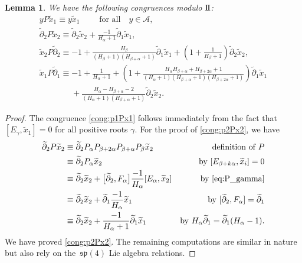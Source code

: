 \documentclass[10pt,a4paper]{amsart}
\numberwithin{equation}{section}
\newtheorem{Lemma}[Theorem]{Lemma}
\newcommand{\II}{\mathrm{I\hspace{-.1em}I}}
\begin{document}
\begin{Lemma} \label{lem:aPb-congruences}
	We have the following congruences modulo $\II$:
	\begin{gather}%
		y P\widetilde{x}_{1} \equiv y\widetilde{x}_{1}\qquad \text{ for all}\quad y \in \mathscr{A}\label{cong:p1Px1},\\
		\widetilde{\partial}_2P\widetilde{x}_2 \equiv \widetilde{\partial}_2\widetilde{x}_2+\frac{-1}{H_\alpha+1}\widetilde{\partial}_1\widetilde{x}_1\label{cong:p2Px2},\\
		\widetilde{x}_2P\widetilde{\partial}_2 \equiv -1 + \frac{H_\beta}{(H_\beta+1)(H_{\beta+\alpha}+1)}\widetilde{\partial}_1\widetilde{x}_1+\left(1+\frac{1}{H_\beta+1}\right)\widetilde{\partial}_2\widetilde{x}_2,\nonumber\\
		\widetilde{x}_1P\widetilde{\partial}_1 \equiv -1+\frac{1}{H_\alpha+1}+\left(1+\frac{H_\alpha H_{\beta+\alpha}+H_{\beta+2\alpha}+1}{(H_\alpha+1)(H_{\beta+\alpha}+1)(H_{\beta+2\alpha}+1)}\right)\widetilde{\partial}_1\widetilde{x}_1\nonumber\\
		 \phantom{\widetilde{x}_1P\widetilde{\partial}_1 \equiv }{} + \frac{H_\alpha-H_{\beta+\alpha}-2}{(H_\alpha+1)(H_{\beta+\alpha}+1)}\widetilde{\partial}_2\widetilde{x}_2. \label{cong:x1Pp1}
	\end{gather}
\end{Lemma}

\begin{proof}
	The congruence \eqref{cong:p1Px1} follows immediately from the fact that $[E_\gamma,\widetilde{x}_1]=0$ for all positive roots $\gamma$.
	For the proof of \eqref{cong:p2Px2}, we have
	\begin{align*}
		\widetilde{\partial}_2 P\widetilde{x}_2 &\equiv \widetilde{\partial}_2 P_\alpha P_{\beta+2\alpha} P_{\beta+\alpha} P_\beta \widetilde{x}_2 &\text{definition of $P$}\\
		&\equiv \widetilde{\partial}_2 P_\alpha \widetilde{x}_2 &\text{by $[E_{\beta+k\alpha},\widetilde{x}_i]=0$}\\
		&\equiv \widetilde{\partial}_2\widetilde{x}_2+\bigl[\widetilde{\partial}_2,F_\alpha\bigr]\frac{-1}{H_\alpha}[E_\alpha,\widetilde{x}_2]&\text{by \eqref{eq:P_gamma}}\\
		&\equiv \widetilde{\partial}_2\widetilde{x}_2 + \widetilde{\partial}_1\frac{-1}{H_\alpha}\widetilde{x}_1&\text{by $[\widetilde{\partial}_2,F_\alpha]=\widetilde{\partial}_1$}\\
		&\equiv \widetilde{\partial}_2\widetilde{x}_2+\frac{-1}{H_\alpha+1}\widetilde{\partial}_1\widetilde{x}_1&\text{by $H_\alpha\widetilde{\partial}_1=\widetilde{\partial}_1(H_\alpha-1)$}.
	\end{align*}
	We have proved \eqref{cong:p2Px2}. The remaining computations are similar in nature but also rely on the~$\mathfrak{sp}(4)$ Lie algebra relations.
\end{proof}
\end{document}
